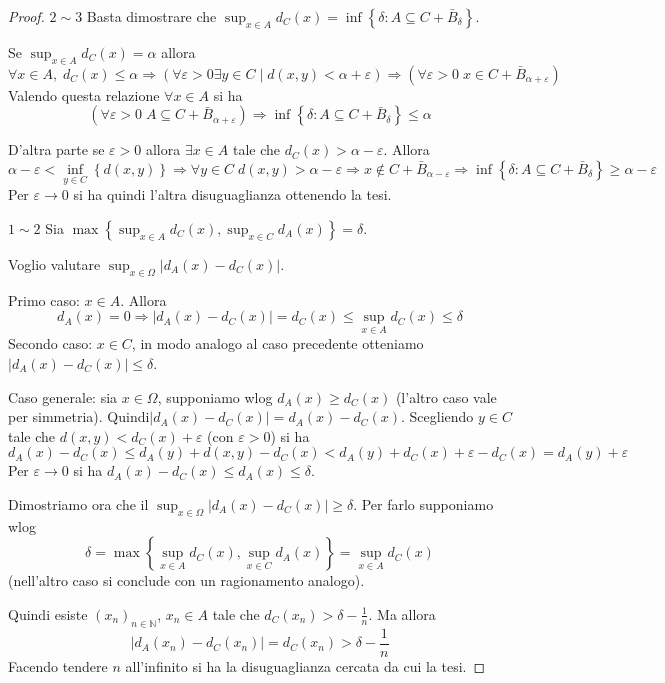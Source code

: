 \documentclass[a4paper,10pt]{article}
\theoremstyle{plain}
\theoremstyle{definition}
\theoremstyle{remark}
\newcommand{\set}[1]{\left\{#1\right\}}
\newcommand{\pa}[1]{\left(#1\right)}
\newcommand{\abs}[1]{\left|#1\right|}
\begin{document}
\begin{proof}
  \textbf{$2 \sim 3$} Basta dimostrare che $\sup _{x\in A} d_C(x) =
  \inf \set{ \delta : A \subseteq C + \bar B _{\delta}}$.

  Se $\sup _{x\in A} d_C(x) = \alpha$ allora
  \[ \forall x \in A, \; d_C (x) \le \alpha \Rightarrow \pa{\forall
    \varepsilon > 0 \exists y \in C \mid d(x,y) < \alpha +
    \varepsilon} \Rightarrow \pa{\forall \varepsilon > 0 \; x
    \in C + \bar B _{\alpha + \varepsilon}}\]
  Valendo questa relazione $\forall x \in A$ si ha
  \[ \pa{\forall \varepsilon > 0 \; A \subseteq C + \bar B _{\alpha +
      \varepsilon}} \Rightarrow \inf \set{ \delta : A \subseteq C +
    \bar B _{\delta}} \le \alpha \]

  D'altra parte se $\varepsilon > 0$ allora $\exists x \in A$ tale che
  $d_C(x) > \alpha - \varepsilon$. Allora
  \[ \alpha - \varepsilon < \inf_{y\in C}\set{d(x,y)} \Rightarrow
  \forall y \in C\; d(x,y) > \alpha - \varepsilon \Rightarrow x\not\in
  C + \bar B_{\alpha - \varepsilon} \Rightarrow \inf \set{ \delta : A
    \subseteq C + \bar B _{\delta}} \ge \alpha - \varepsilon\]
  Per $\varepsilon \rightarrow 0$ si ha quindi l'altra disuguaglianza
  ottenendo la tesi.

  \textbf{$1\sim 2$}
  Sia $\max \set{\sup _{x\in A} d_C (x) , \sup _{x\in C} d_A (x) } =
  \delta$.
  
  Voglio valutare $\sup_{x\in \Omega} \abs{d_A(x)-d_C(x)}$.

  Primo caso: $x\in A$. Allora
  \[ d_A(x) = 0 \Rightarrow \abs{d_A(x)-d_C(x)} = d_C(x) \le \sup
  _{x\in A} d_C (x) \le \delta \]
  Secondo caso: $x\in C$, in modo analogo al caso precedente otteniamo
  $\abs{d_A(x)-d_C(x)} \le \delta$.
  
  Caso generale: sia $x\in \Omega$, supponiamo wlog $d_A(x) \ge d_C(x)$
  (l'altro caso vale per simmetria). Quindi$\abs{d_A(x)-d_C(x)} =
  d_A(x)-d_C(x)$. Scegliendo $y \in C$ tale che $d(x,y) < d_C(x) +
  \varepsilon$ (con $\varepsilon > 0$) si ha
  \[ d_A(x)-d_C(x) \le d_A(y) + d(x,y) - d_C(x) < d_A(y) + d_C(x) +
  \varepsilon -d_C(x) = d_A(y) + \varepsilon\]
  Per $\varepsilon \rightarrow 0$ si ha $d_A(x) - d_C(x) \le d_A(x)
  \le \delta$.

  Dimostriamo ora che il $\sup_{x\in \Omega} \abs{d_A(x)-d_C(x)} \ge
  \delta$. Per farlo supponiamo wlog 
  \[ \delta = \max \set{\sup _{x\in A} d_C (x) , \sup _{x\in C} d_A
    (x) } = \sup _{x\in A} d_C (x) \] 
  (nell'altro caso si conclude con un ragionamento analogo).

  Quindi esiste $\pa{x_n}_{n\in\mathbb{N}}$, $x_n\in A$ tale che
  $d_C(x_n) > \delta - \frac{1}{n}$. Ma allora
  \[ \abs{d_A(x_n) - d_C(x_n)} = d_C(x_n) > \delta - \frac{1}{n} \]
  Facendo tendere $n$ all'infinito si ha la disuguaglianza cercata da
  cui la tesi.
\end{proof}
\end{document}
